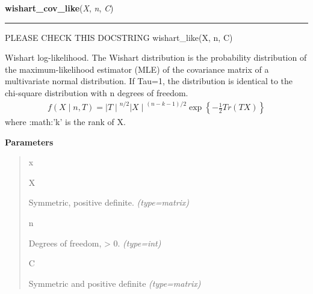     \begin{boxedminipage}{\textwidth}

    \raggedright \textbf{wishart\_cov\_like}(\textit{X}, \textit{n}, \textit{C})

    \vspace{-1.5ex}

    \rule{\textwidth}{0.5\fboxrule}

PLEASE CHECK THIS DOCSTRING
wishart{\_}like(X, n, C)

Wishart log-likelihood. The Wishart distribution is the probability
distribution of the maximum-likelihood estimator (MLE) of the covariance
matrix of a multivariate normal distribution. If Tau=1, the distribution
is identical to the chi-square distribution with n degrees of freedom.
\begin{equation*}\begin{split}f(X \mid n, T) = {\mid T \mid}^{n/2}{\mid X \mid}^{(n-k-1)/2} \exp\left\{ -\frac{1}{2} Tr(TX) \right\}\end{split}\end{equation*}
where :math:'k' is the rank of X.
    \vspace{1ex}

      \textbf{Parameters}
      \begin{quote}
        \begin{Ventry}{x}

          \item[X]


Symmetric, positive definite.
            \textit{(type=matrix)}

          \item[n]


Degrees of freedom, {\textgreater} 0.
            \textit{(type=int)}

          \item[C]


Symmetric and positive definite
            \textit{(type=matrix)}

        \end{Ventry}

      \end{quote}

    \vspace{1ex}

    \end{boxedminipage}

    \label{pymc:distributions:name_to_funcs}

